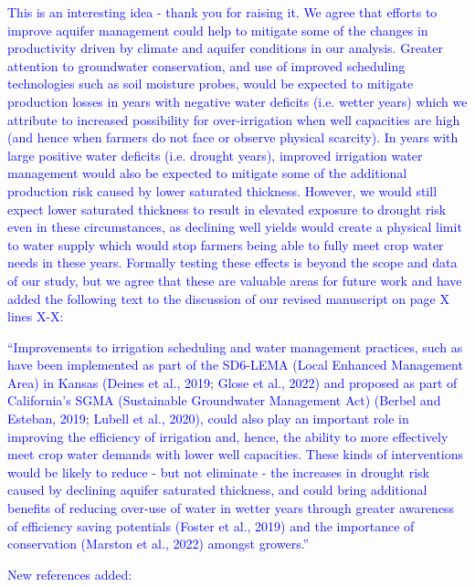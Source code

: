 \documentclass[
]{article}
\begin{document}
\textcolor{blue}{This is an interesting idea - thank you for raising it. We agree that efforts to improve aquifer management could help to mitigate some of the changes in productivity driven by climate and aquifer conditions in our analysis. Greater attention to groundwater conservation, and use of improved scheduling technologies such as soil moisture probes, would be expected to mitigate production losses in years with negative water deficits (i.e. wetter years) which we attribute to increased possibility for over-irrigation when well capacities are high (and hence when farmers do not face or observe physical scarcity). In years with large positive water deficits (i.e. drought years), improved irrigation water management would also be expected to mitigate some of the additional production risk caused by lower saturated thickness. However, we would still expect lower saturated thickness to result in elevated exposure to drought risk even in these circumstances, as declining well yields would create a physical limit to water supply which would stop farmers being able to fully meet crop water needs in these years. Formally testing these effects is beyond the scope and data of our study, but we agree that these are valuable areas for future work and have added the following text to the discussion of our revised manuscript on page X lines X-X:}

\textcolor{blue}{``Improvements to irrigation scheduling and water management practices, such as have been implemented as part of the SD6-LEMA (Local Enhanced Management Area) in Kansas (Deines et al., 2019; Glose et al., 2022) and proposed as part of California's SGMA (Sustainable Groundwater Management Act) (Berbel and Esteban, 2019; Lubell et al., 2020), could also play an important role in improving the efficiency of irrigation and, hence, the ability to more effectively meet crop water demands with lower well capacities. These kinds of interventions would be likely to reduce - but not eliminate - the increases in drought risk caused by declining aquifer saturated thickness, and could bring additional benefits of reducing over-use of water in wetter years through greater awareness of efficiency saving potentials (Foster et al., 2019) and the importance of conservation (Marston et al., 2022) amongst growers.''}

\textcolor{blue}{New references added:}
\end{document}

